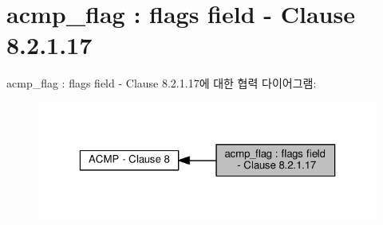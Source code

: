 \hypertarget{group__acmp__flag}{}\section{acmp\+\_\+flag \+: flags field -\/ Clause 8.2.1.17}
\label{group__acmp__flag}
acmp\+\_\+flag \+: flags field -\/ Clause 8.2.1.17에 대한 협력 다이어그램\+:
\nopagebreak
\begin{figure}[H]
\begin{center}
\leavevmode
\includegraphics[width=323pt]{group__acmp__flag}
\end{center}
\end{figure}
